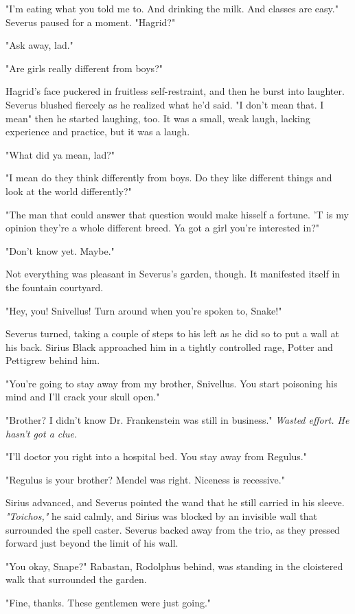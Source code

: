 "I'm eating what you told me to. And drinking the milk. And classes are easy." Severus paused for a moment. "Hagrid?"

"Ask away, lad."

"Are girls really different from boys?"

Hagrid's face puckered in fruitless self-restraint, and then he burst into laughter. Severus blushed fiercely as he realized what he'd said. "I don't mean that. I mean{\el}" then he started laughing, too. It was a small, weak laugh, lacking experience and practice, but it was a laugh.

"What did ya mean, lad?"

"I mean do they think differently from boys. Do they like different things and look at the world differently?"

"The man that could answer that question would make hisself a fortune. 'T is my opinion they're a whole different breed. Ya got a girl you're interested in?"

"Don't know yet. Maybe."

Not everything was pleasant in Severus's garden, though. It manifested itself in the fountain courtyard.

"Hey, you! Snivellus! Turn around when you're spoken to, Snake!"

Severus turned, taking a couple of steps to his left as he did so to put a wall at his back. Sirius Black approached him in a tightly controlled rage, Potter and Pettigrew behind him.

"You're going to stay away from my brother, Snivellus. You start poisoning his mind and I'll crack your skull open."

"Brother? I didn't know Dr. Frankenstein was still in business." \emph{Wasted effort. He hasn't got a clue.}

"I'll doctor you right into a hospital bed. You stay away from Regulus."

"Regulus is your brother? Mendel was right. Niceness is recessive."

Sirius advanced, and Severus pointed the wand that he still carried in his sleeve. \emph{"Toichos,"} he said calmly, and Sirius was blocked by an invisible wall that surrounded the spell caster. Severus backed away from the trio, as they pressed forward just beyond the limit of his wall.

"You okay, Snape?" Rabastan, Rodolphus behind, was standing in the cloistered walk that surrounded the garden.

"Fine, thanks. These gentlemen were just going."

